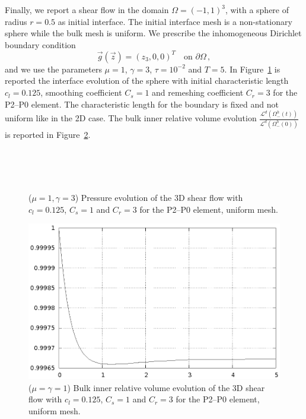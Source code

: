 \documentclass[a4paper,12pt,onecolumn]{article}
\begin{document}
Finally, we report a shear flow in the domain $\Omega=(-1,1)^3$, with a sphere of radius $r=0.5$ as initial interface. The initial interface mesh is a non-stationary sphere while the bulk mesh is uniform. We prescribe the inhomogeneous Dirichlet boundary condition
\begin{equation*}
\vec g(\vec z)=(z_3,0,0)^T\quad \mbox{on }\partial\Omega\,,
\end{equation*}
and we use the parameters $\mu=1$, $\gamma=3$, $\tau=10^{-2}$ and $T=5$. In Figure~\ref{fig:shear_3d} is reported the interface evolution of the sphere with initial characteristic length $c_l=0.125$, smoothing coefficient $C_s=1$ and remeshing coefficient $C_r=3$ for the P2--P0 element. The characteristic length for the boundary is fixed and not uniform like in the 2D case. The bulk inner relative volume evolution $\frac{\mathcal{L}^d(\Omega^h_-(t))}{\mathcal{L}^d(\Omega^h_-(0))}$ is reported in Figure~\ref{fig:shear_3d_bulk_inner_volume}.
\begin{figure}[htbp]
  \centering
  \\
  \quad
  \\
  \quad
  \\
  \caption{($\mu=1,\gamma=3$) Pressure evolution of the 3D shear flow with $c_l=0.125$, $C_s=1$ and $C_r=3$ for the P2--P0 element, uniform mesh.}
  \label{fig:shear_3d}
\end{figure}

\begin{figure}[htbp]
  \centering
  \includegraphics[width=.45\textwidth]{figures/3d_shear_bulk_inner_volume.ps}
  \caption{($\mu=\gamma=1$) Bulk inner relative volume evolution of the 3D shear flow with $c_l=0.125$, $C_s=1$ and $C_r=3$ for the P2--P0 element, uniform mesh.}
  \label{fig:shear_3d_bulk_inner_volume}
\end{figure}
\end{document}
